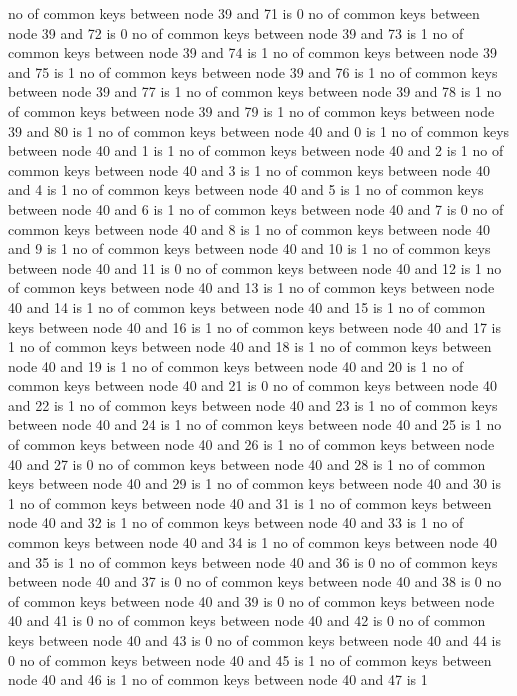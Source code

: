 no of common keys between node 39 and 71 is 0
no of common keys between node 39 and 72 is 0
no of common keys between node 39 and 73 is 1
no of common keys between node 39 and 74 is 1
no of common keys between node 39 and 75 is 1
no of common keys between node 39 and 76 is 1
no of common keys between node 39 and 77 is 1
no of common keys between node 39 and 78 is 1
no of common keys between node 39 and 79 is 1
no of common keys between node 39 and 80 is 1
no of common keys between node 40 and 0 is 1
no of common keys between node 40 and 1 is 1
no of common keys between node 40 and 2 is 1
no of common keys between node 40 and 3 is 1
no of common keys between node 40 and 4 is 1
no of common keys between node 40 and 5 is 1
no of common keys between node 40 and 6 is 1
no of common keys between node 40 and 7 is 0
no of common keys between node 40 and 8 is 1
no of common keys between node 40 and 9 is 1
no of common keys between node 40 and 10 is 1
no of common keys between node 40 and 11 is 0
no of common keys between node 40 and 12 is 1
no of common keys between node 40 and 13 is 1
no of common keys between node 40 and 14 is 1
no of common keys between node 40 and 15 is 1
no of common keys between node 40 and 16 is 1
no of common keys between node 40 and 17 is 1
no of common keys between node 40 and 18 is 1
no of common keys between node 40 and 19 is 1
no of common keys between node 40 and 20 is 1
no of common keys between node 40 and 21 is 0
no of common keys between node 40 and 22 is 1
no of common keys between node 40 and 23 is 1
no of common keys between node 40 and 24 is 1
no of common keys between node 40 and 25 is 1
no of common keys between node 40 and 26 is 1
no of common keys between node 40 and 27 is 0
no of common keys between node 40 and 28 is 1
no of common keys between node 40 and 29 is 1
no of common keys between node 40 and 30 is 1
no of common keys between node 40 and 31 is 1
no of common keys between node 40 and 32 is 1
no of common keys between node 40 and 33 is 1
no of common keys between node 40 and 34 is 1
no of common keys between node 40 and 35 is 1
no of common keys between node 40 and 36 is 0
no of common keys between node 40 and 37 is 0
no of common keys between node 40 and 38 is 0
no of common keys between node 40 and 39 is 0
no of common keys between node 40 and 41 is 0
no of common keys between node 40 and 42 is 0
no of common keys between node 40 and 43 is 0
no of common keys between node 40 and 44 is 0
no of common keys between node 40 and 45 is 1
no of common keys between node 40 and 46 is 1
no of common keys between node 40 and 47 is 1
